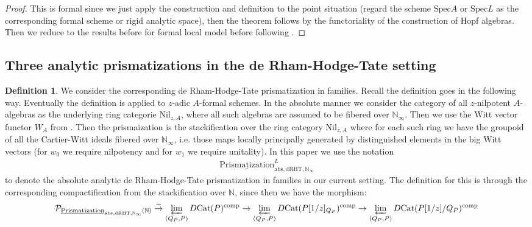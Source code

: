 \documentclass[12pt]{article}
\theoremstyle{definition}
\newtheorem{definition}{Definition}
\begin{document}
\begin{proof}
This is formal since we just apply the construction and definition to the point situation (regard the scheme $\mathrm{Spec}A$ or $\mathrm{Spec}L$ as the corresponding formal scheme or rigid analytic space), then the theorem follows by the functoriality of the construction of Hopf algebras. Then we reduce to the results before for formal local model before following \cite{3A}. 
\end{proof}




\subsection{Three analytic prismatizations in the de Rham-Hodge-Tate setting}


\begin{definition}
We consider the corresponding de Rham-Hodge-Tate prismatization in families. Recall the definition goes in the following way. Eventually the definition is applied to $z$-adic $A$-formal schemes. In the absolute manner we consider the category of all $z$-nilpotent $A$-algebras as the underlying ring categorie $\mathrm{Nil}_{z,A}$, where all such algebras are assumed to be fibered over $\mathbb{N}_\infty$. Then we use the Witt vector functor $W_A$ from \cite{3LH}. Then the prismaization is the stackification over the ring category $\mathrm{Nil}_{z,A}$ where for each such ring we have the groupoid of all the Cartier-Witt ideals fibered over $\mathbb{N}_\infty$, i.e. those maps locally principally generated by distinguished elements in the big Witt vectors (for $w_0$ we require nilpotency and for $w_1$ we require unitality). In this paper we use the notation 
\begin{align}
\underline{\mathrm{Prismatization}}^L_{\mathrm{abs},\mathrm{dRHT},\mathbb{N}_\infty}
\end{align}
to denote the absolute analytic de Rham-Hodge-Tate prismatization in families in our current setting. The definition for this is through the corresponding compactification from the stackification over $\mathbb{N}$, since then we have the morphism:
\begin{align}
\mathcal{P}_{\underline{\mathrm{Prismatization}}_{\mathrm{abs},\mathrm{dRHT},\mathbb{N}_\infty}(\mathbb{N})} \overset{\sim}{\rightarrow} \varprojlim_{(Q_P,P)} D\mathrm{Cat}(P)^\mathrm{comp}\rightarrow \varprojlim_{(Q_P,P)} D\mathrm{Cat}(P[1/z]_{Q_P})^\mathrm{comp}\rightarrow \varprojlim_{(Q_P,P)} D\mathrm{Cat}(P[1/z]/{Q_P})^\mathrm{comp}

\end{align}
\end{definition}
\end{document}
